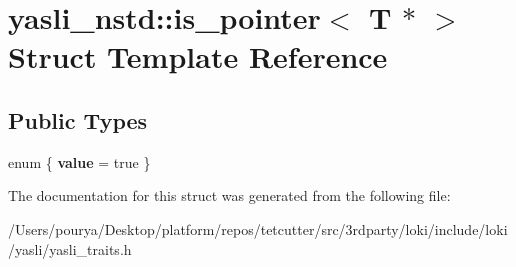 \hypertarget{structyasli__nstd_1_1is__pointer_3_01T_01_5_01_4}{}\section{yasli\+\_\+nstd\+:\+:is\+\_\+pointer$<$ T $\ast$ $>$ Struct Template Reference}
\label{structyasli__nstd_1_1is__pointer_3_01T_01_5_01_4}
\subsection*{Public Types}
\begin{DoxyCompactItemize}
\item 
\hypertarget{structyasli__nstd_1_1is__pointer_3_01T_01_5_01_4_a4635a01fbbcc50150e14654f60018a4a}{}enum \{ {\bfseries value} = true
 \}\label{structyasli__nstd_1_1is__pointer_3_01T_01_5_01_4_a4635a01fbbcc50150e14654f60018a4a}

\end{DoxyCompactItemize}


The documentation for this struct was generated from the following file\+:\begin{DoxyCompactItemize}
\item 
/\+Users/pourya/\+Desktop/platform/repos/tetcutter/src/3rdparty/loki/include/loki/yasli/yasli\+\_\+traits.\+h\end{DoxyCompactItemize}
